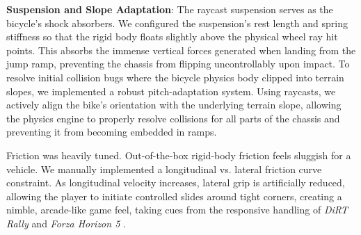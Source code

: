 \documentclass[acmtog, nonacm]{acmart}
\begin{document}
\textbf{Suspension and Slope Adaptation}: The raycast suspension serves as the bicycle's shock absorbers. We configured the suspension's rest length and spring stiffness so that the rigid body floats slightly above the physical wheel ray hit points. This absorbs the immense vertical forces generated when landing from the jump ramp, preventing the chassis from flipping uncontrollably upon impact. To resolve initial collision bugs where the bicycle physics body clipped into terrain slopes, we implemented a robust pitch-adaptation system. Using raycasts, we actively align the bike's orientation with the underlying terrain slope, allowing the physics engine to properly resolve collisions for all parts of the chassis and preventing it from becoming embedded in ramps.

Friction was heavily tuned. Out-of-the-box rigid-body friction feels sluggish for a vehicle. We manually implemented a longitudinal vs. lateral friction curve constraint. As longitudinal velocity increases, lateral grip is artificially reduced, allowing the player to initiate controlled slides around tight corners, creating a nimble, arcade-like game feel, taking cues from the responsive handling of \textit{DiRT Rally} \cite{DirtRally} and \textit{Forza Horizon 5} \cite{ForzaHorizon5, ForzaPhysics}.
\end{document}
